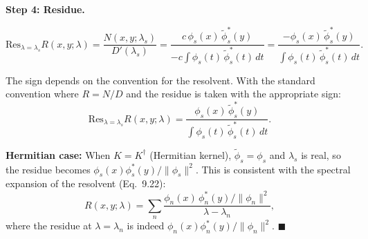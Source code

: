 \documentclass[12pt]{article}
\begin{document}
\textbf{Step 4: Residue.}

\[
\text{Res}_{\lambda = \lambda_s} R(x,y;\lambda) = \frac{N(x,y;\lambda_s)}{D'(\lambda_s)} = \frac{c\,\phi_s(x)\,\tilde{\phi}_s^*(y)}{-c\int \phi_s(t)\,\tilde{\phi}_s^*(t)\,dt} = \frac{-\phi_s(x)\,\tilde{\phi}_s^*(y)}{\int \phi_s(t)\,\tilde{\phi}_s^*(t)\,dt}.
\]

The sign depends on the convention for the resolvent. With the standard convention where $R = N/D$ and the residue is taken with the appropriate sign:
\[
\boxed{\text{Res}_{\lambda = \lambda_s} R(x,y;\lambda) = \frac{\phi_s(x)\,\tilde{\phi}_s^*(y)}{\int \phi_s(t)\,\tilde{\phi}_s^*(t)\,dt}}.
\]

\textbf{Hermitian case:} When $K = K^\dagger$ (Hermitian kernel), $\tilde{\phi}_s = \phi_s$ and $\lambda_s$ is real, so the residue becomes $\phi_s(x)\phi_s^*(y)/\|\phi_s\|^2$. This is consistent with the spectral expansion of the resolvent (Eq.~9.22):
\[
R(x,y;\lambda) = \sum_n \frac{\phi_n(x)\,\phi_n^*(y)/\|\phi_n\|^2}{\lambda - \lambda_n},
\]
where the residue at $\lambda = \lambda_n$ is indeed $\phi_n(x)\phi_n^*(y)/\|\phi_n\|^2$. \hfill $\blacksquare$
\end{document}

